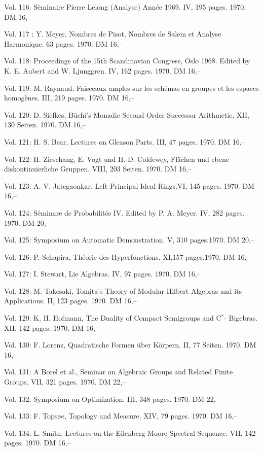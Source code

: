 Vol. 116: Sèminaire Pierre Lelong (Analyse) Année 1969. IV, 195 pages. 1970. DM 16,--

Vol. 117 : Y. Meyer, Nombres de Pisot, Nombres de Salem et Analyse Harmonique. 63 pages. 1970. DM 16,--

Vol. 118: Proceedings of the 15th Scandinavian Congress, Oslo 1968. Edited by K. E. Aubert and W. Ljunggren. IV, 162 pages. 1970. DM 16,--

Vol. 119: M. Raynaud, Faisceaux amples sur les schémas en groupes et les espaces homogènes. III, 219 pages. 1970. DM 16,--

Vol. 120: D. Siefkes, Büchi's Monadic Second Order Successor Arithmetic. XII, 130 Seiten. 1970. DM 16,--

Vol. 121: H. S. Bear, Lectures on Gleason Parts. III, 47 pages. 1970. DM 16,--

Vol. 122: H. Zieschang, E. Vogt und H.-D. Coldewey, Flächen und ebene diskontinuierliche Gruppen. VIII, 203 Seiten. 1970. DM 16,--

Vol. 123: A. V. Jategaonkar, Left Principal Ideal Rings.VI, 145 pages. 1970. DM 16,--

Vol. 124: Séminare de Probabilités IV. Edited by P. A. Meyer. IV, 282 pages. 1970. DM 20,--

Vol. 125: Symposium on Automatic Demonstration. V, 310 pages.1970. DM 20,--

Vol. 126: P. Schapira, Théorie des Hyperfonctions. XI,157 pages.1970. DM 16,--

Vol. 127: I. Stewart, Lie Algebras. IV, 97 pages. 1970. DM 16,--

Vol. 128: M. Takesaki, Tomita's Theory of Modular Hilbert Algebras and its Applications. II, 123 pages. 1970. DM 16,--

Vol. 129: K. H. Hofmann, The Duality of Compact Semigroups and C$^*$- Bigebras. XII, 142 pages. 1970. DM 16,--

Vol. 130: F. Lorenz, Quadratische Formen über Körpern. II, 77 Seiten. 1970. DM 16,--

Vol. 131: A Borel et al., Seminar on Algebraic Groups and Related Finite Groups. VII, 321 pages. 1970. DM 22,--

Vol. 132: Symposium on Optimization. III, 348 pages. 1970. DM 22,--

Vol. 133: F. Topsøe, Topology and Measure. XIV, 79 pages. 1970. DM 16,--

Vol. 134: L. Smith, Lectures on the Eilenberg-Moore Spectral Sequence. VII, 142 pages. 1970. DM 16,--

